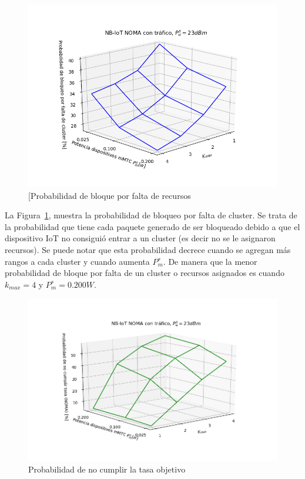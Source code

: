 \begin{figure}[th]
    \centering
    \includegraphics[scale=0.9]{Figures/ResultadosTrafico/Figure_1.png}
    \decoRule
    \caption[Probabilidad de bloque por falta de recursos]{[Probabilidad de bloque por falta de recursos}
    \label{fig:bloqueocluster}
\end{figure}

La Figura~\ref{fig:bloqueocluster}, muestra la probabilidad de bloqueo por falta de cluster. Se trata de la probabilidad que tiene cada paquete generado de ser bloqueado debido a que el dispositivo IoT no consiguió entrar a un cluster (es decir no se le asignaron recursos). Se puede notar que esta probabilidad decrece cuando se agregan más rangos a cada cluster y cuando aumenta $P_{m}^{s}$. De manera que la menor probabilidad de bloque por falta de un cluster o recursos asignados es cuando $k_{max}=4$ y $P_{m}^{s}=0.200 W$. \newline


\begin{figure}[th]
    \centering
    \includegraphics[scale=0.9]{Figures/ResultadosTrafico/Figure_2.png}
    \decoRule
    \caption[Probabilidad de no cumplir la tasa objetivo]{Probabilidad de no cumplir la tasa objetivo}
    \label{fig:tasa}
\end{figure}


